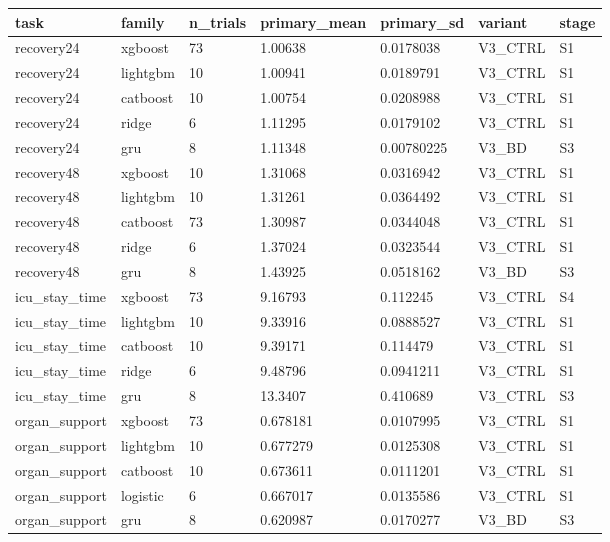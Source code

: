 \begin{tabular}{lllllll}
\hline
task & family & n\_trials & primary\_mean & primary\_sd & variant & stage \\
\hline
recovery24 & xgboost & 73 & 1.00638 & 0.0178038 & V3\_CTRL & S1 \\
recovery24 & lightgbm & 10 & 1.00941 & 0.0189791 & V3\_CTRL & S1 \\
recovery24 & catboost & 10 & 1.00754 & 0.0208988 & V3\_CTRL & S1 \\
recovery24 & ridge & 6 & 1.11295 & 0.0179102 & V3\_CTRL & S1 \\
recovery24 & gru & 8 & 1.11348 & 0.00780225 & V3\_BD & S3 \\
recovery48 & xgboost & 10 & 1.31068 & 0.0316942 & V3\_CTRL & S1 \\
recovery48 & lightgbm & 10 & 1.31261 & 0.0364492 & V3\_CTRL & S1 \\
recovery48 & catboost & 73 & 1.30987 & 0.0344048 & V3\_CTRL & S1 \\
recovery48 & ridge & 6 & 1.37024 & 0.0323544 & V3\_CTRL & S1 \\
recovery48 & gru & 8 & 1.43925 & 0.0518162 & V3\_BD & S3 \\
icu\_stay\_time & xgboost & 73 & 9.16793 & 0.112245 & V3\_CTRL & S4 \\
icu\_stay\_time & lightgbm & 10 & 9.33916 & 0.0888527 & V3\_CTRL & S1 \\
icu\_stay\_time & catboost & 10 & 9.39171 & 0.114479 & V3\_CTRL & S1 \\
icu\_stay\_time & ridge & 6 & 9.48796 & 0.0941211 & V3\_CTRL & S1 \\
icu\_stay\_time & gru & 8 & 13.3407 & 0.410689 & V3\_CTRL & S3 \\
organ\_support & xgboost & 73 & 0.678181 & 0.0107995 & V3\_CTRL & S1 \\
organ\_support & lightgbm & 10 & 0.677279 & 0.0125308 & V3\_CTRL & S1 \\
organ\_support & catboost & 10 & 0.673611 & 0.0111201 & V3\_CTRL & S1 \\
organ\_support & logistic & 6 & 0.667017 & 0.0135586 & V3\_CTRL & S1 \\
organ\_support & gru & 8 & 0.620987 & 0.0170277 & V3\_BD & S3 \\
\hline
\end{tabular}
